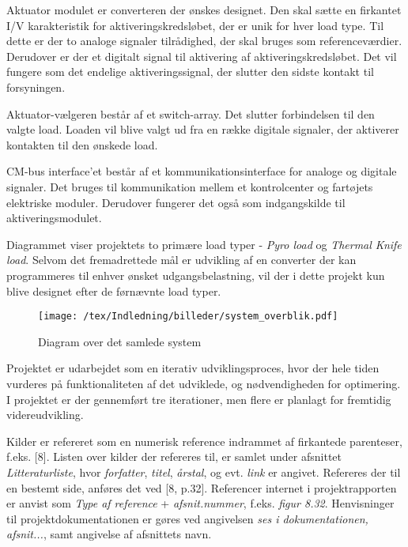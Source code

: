 Aktuator modulet er converteren der ønskes designet. Den skal sætte en firkantet I/V karakteristik for aktiveringskredsløbet, der er unik for hver load type. Til dette er der to analoge signaler tilrådighed, der skal bruges som referenceværdier. Derudover er der et digitalt signal til aktivering af aktiveringskredsløbet. Det vil fungere som det endelige aktiveringssignal, der slutter den sidste kontakt til forsyningen. 

Aktuator-vælgeren består af et switch-array. Det slutter forbindelsen til den valgte load. Loaden vil blive valgt ud fra en række digitale signaler, der aktiverer kontakten til den ønskede load.

CM-bus interface'et består af et kommunikationsinterface for analoge og digitale signaler. Det bruges til kommunikation mellem et kontrolcenter og fartøjets elektriske moduler. Derudover fungerer det også som indgangskilde til aktiveringsmodulet. 

Diagrammet viser projektets to primære load typer - \textit{Pyro load} og \textit{Thermal Knife load}. Selvom det fremadrettede mål er udvikling af en converter der kan programmeres til enhver ønsket udgangsbelastning, vil der i dette projekt kun blive designet efter de førnævnte load typer.

\begin{figure}[H]
	\center
	\texttt{[image: /tex/Indledning/billeder/system\_overblik.pdf]}
	\caption{Diagram over det samlede system}
	\label{fig:system_overblik}
\end{figure}

Projektet er udarbejdet som en iterativ udviklingsproces, hvor der hele tiden vurderes på funktionaliteten af det udviklede, og nødvendigheden for optimering. I projektet er der gennemført tre iterationer, men flere er planlagt for fremtidig videreudvikling. 

Kilder er refereret som en numerisk reference indrammet af firkantede parenteser, f.eks. [8]. Listen over kilder der refereres til, er samlet under afsnittet \textit{Litteraturliste}, hvor \textit{forfatter}, \textit{titel}, \textit{årstal}, og evt. \textit{link} er angivet. Refereres der til en bestemt side, anføres det ved [8, p.32]. Referencer internet i projektrapporten er anvist som \textit{Type af reference} + \textit{afsnit.nummer}, f.eks. \textit{figur 8.32}. Henvisninger til projektdokumentationen er gøres ved  angivelsen \textit{ses i dokumentationen, afsnit...}, samt angivelse af afsnittets navn. 


